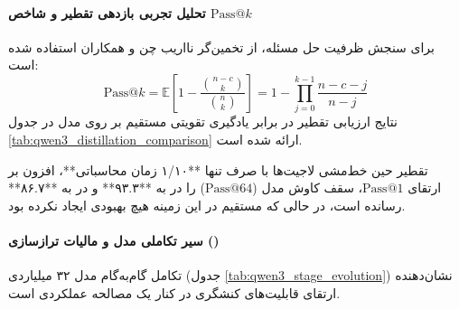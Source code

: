 \paragraph*{تحلیل تجربی بازدهی تقطیر و شاخص $\text{Pass@}k$}
برای سنجش ظرفیت حل مسئله، از تخمین‌گر نااریب چن و همکاران \cite{chen2021codex} استفاده شده است:
\begin{equation}
    \text{Pass@}k = \mathbb{E} \left[ 1 - \frac{\binom{n-c}{k}}{\binom{n}{k}} \right] = 1 - \prod_{j=0}^{k-1} \frac{n - c - j}{n - j}
\end{equation}
نتایج ارزیابی تقطیر در برابر یادگیری تقویتی مستقیم بر روی مدل  در جدول \ref{tab:qwen3_distillation_comparison} ارائه شده است.

\begin{table}[htbp]
\centering
\caption{مقایسه عملکرد و هزینه محاسباتی تقطیر حین خط‌مشی با یادگیری تقویتی روی مدل  (اعداد داخل پرانتز نشان‌دهنده شاخص $\text{Pass@}64$ هستند)}
\label{tab:qwen3_distillation_comparison}
\end{table}

تقطیر حین خط‌مشی لاجیت‌ها با صرف تنها **۱/۱۰ زمان محاسباتی**، افزون بر ارتقای $\text{Pass@}1$، سقف کاوش مدل ($\text{Pass@}64$) را در  به **۹۳.۳** و در  به **۸۶.۷** رسانده است، در حالی که  مستقیم در این زمینه هیچ بهبودی ایجاد نکرده بود.

\paragraph*{سیر تکاملی مدل  و مالیات ترازسازی ()}
تکامل گام‌به‌گام مدل ۳۲ میلیاردی (جدول \ref{tab:qwen3_stage_evolution}) نشان‌دهنده ارتقای قابلیت‌های کنشگری در کنار یک مصالحه عملکردی است.

